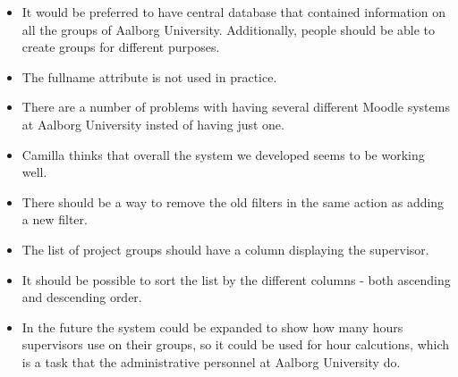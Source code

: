 \begin{itemize}
	\item It would be preferred to have central database that contained information on all the groups of Aalborg University.
Additionally, people should be able to create groups for different purposes.
  \item The fullname attribute is not used in practice.
	\item There are a number of problems with having several different Moodle systems at Aalborg University insted of having just one.
	\item Camilla thinks that overall the system we developed seems to be working well.
	\item There should be a way to remove the old filters in the same action as adding a new filter.
	\item The list of project groups should have a column displaying the supervisor.
	\item It should be possible to sort the list by the different columns - both ascending and descending order.
	\item In the future the system could be expanded to show how many hours supervisors use on their groups, so it could be used for hour calcutions, which is a task that the administrative personnel at Aalborg University do.
\end{itemize}



